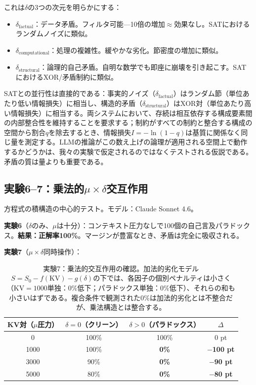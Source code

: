\documentclass[11pt,a4paper]{article}
\begin{document}
これは$\delta$の3つの次元を明らかにする：
\begin{itemize}
    \item $\delta_{\text{factual}}$：データ矛盾。フィルタ可能---10倍の増加$\approx$効果なし。SATにおけるランダムノイズに類似。
    \item $\delta_{\text{computational}}$：処理の複雑性。緩やかな劣化。節密度の増加に類似。
    \item $\delta_{\text{structural}}$：論理的自己矛盾。自明な数学でも即座に崩壊を引き起こす。SATにおけるXOR/矛盾制約に類似。
\end{itemize}

SATとの並行性は直接的である：事実的ノイズ（$\delta_{\text{factual}}$）はランダム節（単位あたり低い情報損失）に相当し、構造的矛盾（$\delta_{\text{structural}}$）はXOR対（単位あたり高い情報損失）に相当する。両システムにおいて、存続は相互依存する構成要素間の内部整合性を維持することを要求する；制約がすべての制約と整合する構成の空間から割合$q$を除去するとき、情報損失$I = -\ln(1-q)$は基質に関係なく同じ量を測定する。LLMの推論がこの数え上げの論理が適用される空間上で動作するかどうかは、我々の実験で仮定されるのではなくテストされる仮説である。矛盾の質は量よりも重要である。

\subsection{実験6--7：乗法的\texorpdfstring{$\mu \times \delta$}{μ×δ}交互作用}

方程式の積構造の中心的テスト。モデル：Claude Sonnet 4.6。

\textbf{実験6}（$\delta$のみ、$\mu$は十分）：コンテキスト圧力なしで100個の自己言及パラドックス。\textbf{結果：正解率100\%}。マージンが豊富なとき、矛盾は完全に吸収される。

\textbf{実験7}（$\mu \times \delta$同時操作）：

\begin{table}[htbp]
\centering
\begin{tabular}{cccc}
\toprule
\textbf{KV対（$\mu$圧力）} & \textbf{$\delta = 0$（クリーン）} & \textbf{$\delta > 0$（パラドックス）} & \textbf{$\Delta$} \\
\midrule
0 & 100\% & 100\% & 0 pt \\
1000 & 100\% & \textbf{0\%} & \textbf{$-$100 pt} \\
3000 & 90\% & \textbf{0\%} & \textbf{$-$90 pt} \\
5000 & 80\% & \textbf{0\%} & \textbf{$-$80 pt} \\
\bottomrule
\end{tabular}
\caption{実験7：乗法的交互作用の確認。加法的劣化モデル$S = S_0 - f(\text{KV}) - g(\delta)$の下では、各因子の個別ペナルティは小さく（KV$=1000$単独：0\%低下；パラドックス単独：0\%低下）、それらの和も小さいはずである。複合条件で観測された0\%は加法的劣化とは不整合だが、乗法構造とは整合する。}
\label{tab:exp7}
\end{table}
\end{document}
